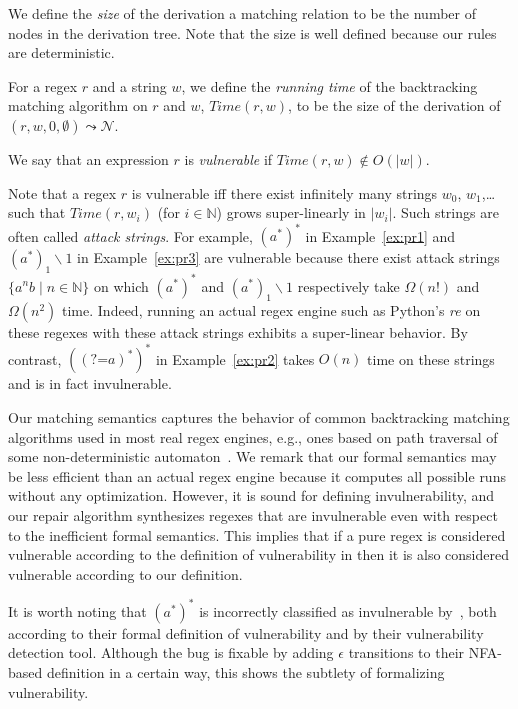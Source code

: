 \documentclass[conference]{IEEEtran}
\newcommand{\runtime}{\mathit{Time}}
\begin{document}
We define the {\em size} of the derivation a matching relation to be the number of nodes in the derivation tree.  Note that the size is well defined because our rules are deterministic.
\begin{definition}
\normalfont
For a regex $r$ and a string $w$, we define the {\em running time} of the backtracking matching algorithm on $r$ and $w$, $\runtime(r,w)$, to be the size of the derivation of $(r, w, 0, \emptyset) \leadsto \mathcal{N}$.
\end{definition}
\begin{definition}
\label{def:vulnerable}
\normalfont
We say that an expression $r$ is {\em vulnerable} if $\runtime(r,w) \notin O(|w|)$.
\end{definition}
Note that a regex $r$ is vulnerable iff there exist infinitely many strings $w_0$, $w_1$,\dots such that $\runtime(r,w_i)$ (for $i \in \mathbb{N}$) grows super-linearly in $|w_i|$. Such strings are often called {\em attack strings}.
For example, $(a^*)^*$ in Example~\ref{ex:pr1} 
and $(a^*)_1\backslash1$ in Example~\ref{ex:pr3} are vulnerable because there exist attack strings $\{ a^nb \mid n \in \mathbb{N} \}$ on which $(a^*)^*$ and $(a^*)_1\backslash1$ respectively take $\Omega(n!)$ and $\Omega(n^2)$ time.  Indeed, running an actual regex engine such as Python's \textit{re} on these regexes with these attack strings exhibits a super-linear behavior.  By contrast, $((\mbox{?=}a)^*)^*$ in Example~\ref{ex:pr2} takes $O(n)$ time on these strings and is in fact invulnerable.  


Our matching semantics captures the behavior of common backtracking matching algorithms used in most real regex engines, e.g., ones based on path traversal of some non-deterministic automaton~\cite{10.1007/978-3-662-54580-5_1, Shen:2018:RCR:3238147.3238159, revealear}. 
We remark that our formal semantics may be less efficient than an actual regex engine because it computes all possible runs without any optimization.  However, it is sound for defining invulnerability, and our repair algorithm synthesizes regexes that are invulnerable even with respect to the inefficient formal semantics.
This implies that if a pure regex is considered vulnerable according to the definition of vulnerability in \cite{10.1007/978-3-662-54580-5_1} then it is also considered vulnerable according to our definition.

It is worth noting that $(a^*)^*$ is incorrectly classified as invulnerable by~\cite{10.1007/978-3-662-54580-5_1}, both according to their formal definition of vulnerability and by their vulnerability detection tool.  Although the bug is fixable by adding $\epsilon$ transitions to their NFA-based definition in a certain way, this shows the subtlety of formalizing vulnerability. 
\end{document}

